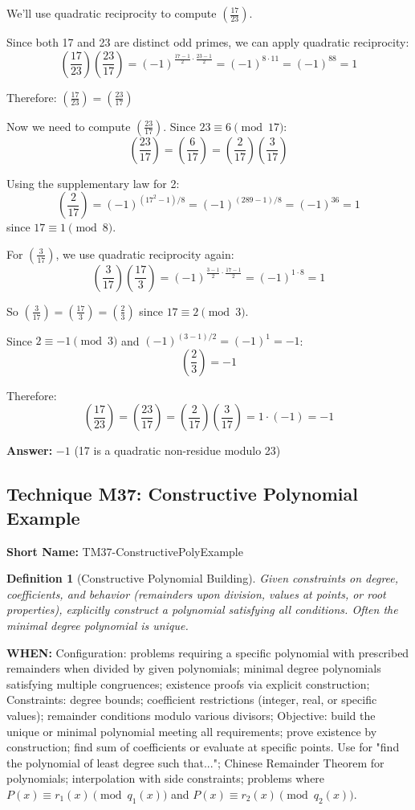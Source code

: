 \documentclass[12pt]{article}
\newtheorem{definition}{Definition}[section]
\newenvironment{solution}
{\begin{tcolorbox}[colback=green!5!white,colframe=green!75!black,title={Solution}]}{\end{tcolorbox}}
\begin{document}
\begin{solution}
We'll use quadratic reciprocity to compute $\left(\frac{17}{23}\right)$.

Since both 17 and 23 are distinct odd primes, we can apply quadratic reciprocity:
\[
\left(\frac{17}{23}\right)\left(\frac{23}{17}\right) = (-1)^{\frac{17-1}{2} \cdot \frac{23-1}{2}} = (-1)^{8 \cdot 11} = (-1)^{88} = 1
\]

Therefore: $\left(\frac{17}{23}\right) = \left(\frac{23}{17}\right)$

Now we need to compute $\left(\frac{23}{17}\right)$. Since $23 \equiv 6 \pmod{17}$:
\[
\left(\frac{23}{17}\right) = \left(\frac{6}{17}\right) = \left(\frac{2}{17}\right)\left(\frac{3}{17}\right)
\]

Using the supplementary law for 2:
\[
\left(\frac{2}{17}\right) = (-1)^{(17^2-1)/8} = (-1)^{(289-1)/8} = (-1)^{36} = 1
\]
since $17 \equiv 1 \pmod{8}$.

For $\left(\frac{3}{17}\right)$, we use quadratic reciprocity again:
\[
\left(\frac{3}{17}\right)\left(\frac{17}{3}\right) = (-1)^{\frac{3-1}{2} \cdot \frac{17-1}{2}} = (-1)^{1 \cdot 8} = 1
\]

So $\left(\frac{3}{17}\right) = \left(\frac{17}{3}\right) = \left(\frac{2}{3}\right)$ since $17 \equiv 2 \pmod{3}$.

Since $2 \equiv -1 \pmod{3}$ and $(-1)^{(3-1)/2} = (-1)^1 = -1$:
\[
\left(\frac{2}{3}\right) = -1
\]

Therefore:
\[
\left(\frac{17}{23}\right) = \left(\frac{23}{17}\right) = \left(\frac{2}{17}\right)\left(\frac{3}{17}\right) = 1 \cdot (-1) = -1
\]

\textbf{Answer:} $-1$ (17 is a quadratic non-residue modulo 23)
\end{solution}

\subsection{Technique M37: Constructive Polynomial Example}
\textbf{Short Name:} TM37-ConstructivePolyExample

\begin{definition}[Constructive Polynomial Building]
Given constraints on degree, coefficients, and behavior (remainders upon division, values at points, or root properties), explicitly construct a polynomial satisfying all conditions. Often the minimal degree polynomial is unique.
\end{definition}

\textbf{WHEN:} Configuration: problems requiring a specific polynomial with prescribed remainders when divided by given polynomials; minimal degree polynomials satisfying multiple congruences; existence proofs via explicit construction; Constraints: degree bounds; coefficient restrictions (integer, real, or specific values); remainder conditions modulo various divisors; Objective: build the unique or minimal polynomial meeting all requirements; prove existence by construction; find sum of coefficients or evaluate at specific points. Use for "find the polynomial of least degree such that..."; Chinese Remainder Theorem for polynomials; interpolation with side constraints; problems where $P(x) \equiv r_1(x) \pmod{q_1(x)}$ and $P(x) \equiv r_2(x) \pmod{q_2(x)}$.
\end{document}

